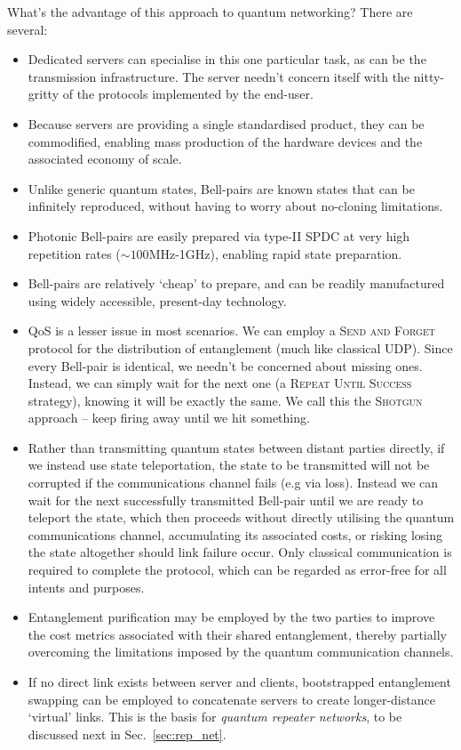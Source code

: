 \documentclass[aps, rmp, twocolumn, amsmath, amssymb, nofootinbib, superscriptaddress, longbibliography, floatfix, table-of-contents, eqsecnum]{revtex4-1}
\begin{document}
What's the advantage of this approach to quantum networking? There are several:
\begin{itemize}
\item Dedicated servers can specialise in this one particular task, as can be the transmission infrastructure. The server needn't concern itself with the nitty-gritty of the protocols implemented by the end-user.
\item Because servers are providing a single standardised product, they can be commodified, enabling mass production of the hardware devices and the associated economy of scale.
\item Unlike generic quantum states, Bell-pairs are known states that can be infinitely reproduced, without having to worry about no-cloning limitations.
\item Photonic Bell-pairs are easily prepared via type-II SPDC at very high repetition rates (\mbox{$\sim 100$MHz-1GHz}), enabling rapid state preparation.
\item Bell-pairs are relatively `cheap' to prepare, and can be readily manufactured using widely accessible, present-day technology.
\item QoS is a lesser issue in most scenarios. We can employ a \textsc{Send and Forget} protocol for the distribution of entanglement (much like classical UDP). Since every Bell-pair is identical, we needn't be concerned about missing ones. Instead, we can simply wait for the next one (a \textsc{Repeat Until Success} strategy), knowing it will be exactly the same. We call this the \textsc{Shotgun} approach -- keep firing away until we hit something.
\item Rather than transmitting quantum states between distant parties directly, if we instead use state teleportation, the state to be transmitted will not be corrupted if the communications channel fails (e.g via loss). Instead we can wait for the next successfully transmitted Bell-pair until we are ready to teleport the state, which then proceeds without directly utilising the quantum communications channel, accumulating its associated costs, or risking losing the state altogether should link failure occur. Only classical communication is required to complete the protocol, which can be regarded as error-free for all intents and purposes.
\item Entanglement purification may be employed by the two parties to improve the cost metrics associated with their shared entanglement, thereby partially overcoming the limitations imposed by the quantum communication channels.
\item If no direct link exists between server and clients, bootstrapped entanglement swapping can be employed to concatenate servers to create longer-distance `virtual' links. This is the basis for \textit{quantum repeater networks}, to be discussed next in Sec.~\ref{sec:rep_net}.
\end{itemize}
\end{document}
